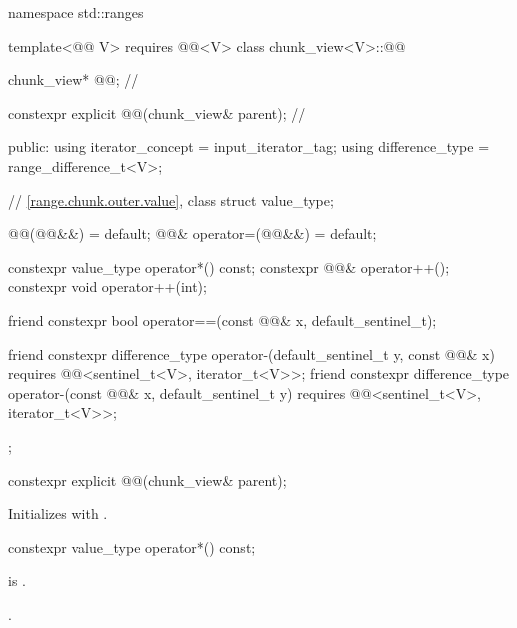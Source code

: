 %
\begin{codeblock}
namespace std::ranges {
  template<@@ V>
    requires @@<V>
  class chunk_view<V>::@@ {
    chunk_view* @@;                                        // \expos

    constexpr explicit @@(chunk_view& parent);      // \expos

  public:
    using iterator_concept = input_iterator_tag;
    using difference_type  = range_difference_t<V>;

    // \ref{range.chunk.outer.value}, class 
    struct value_type;

    @@(@@&&) = default;
    @@& operator=(@@&&) = default;

    constexpr value_type operator*() const;
    constexpr @@& operator++();
    constexpr void operator++(int);

    friend constexpr bool operator==(const @@& x, default_sentinel_t);

    friend constexpr difference_type operator-(default_sentinel_t y, const @@& x)
      requires @@<sentinel_t<V>, iterator_t<V>>;
    friend constexpr difference_type operator-(const @@& x, default_sentinel_t y)
      requires @@<sentinel_t<V>, iterator_t<V>>;
  };
}
\end{codeblock}

\begin{itemdecl}
constexpr explicit @@(chunk_view& parent);
\end{itemdecl}

\begin{itemdescr}
\pnum
\effects
Initializes  with .
\end{itemdescr}

\begin{itemdecl}
constexpr value_type operator*() const;
\end{itemdecl}

\begin{itemdescr}
\pnum
\expects
{} is .

\pnum
\returns
{}.
\end{itemdescr}

